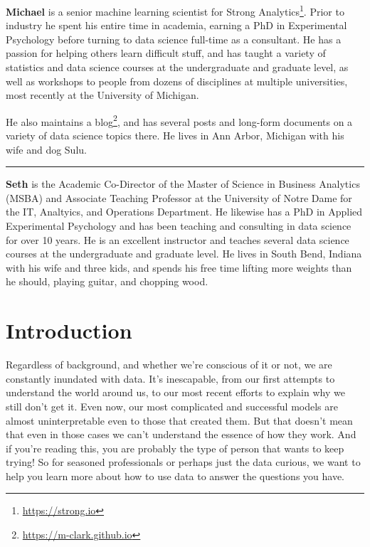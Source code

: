 \documentclass[
  letterpaper,
]{krantz}
\DeclareRobustCommand{\href}[2]{#2\footnote{\url{#1}}}
\begin{document}
\textbf{Michael} is a senior machine learning scientist for
\href{https://strong.io}{Strong Analytics}. Prior to industry he spent
his entire time in academia, earning a PhD in Experimental Psychology
before turning to data science full-time as a consultant. He has a
passion for helping others learn difficult stuff, and has taught a
variety of statistics and data science courses at the undergraduate and
graduate level, as well as workshops to people from dozens of
disciplines at multiple universities, most recently at the University of
Michigan.

He also maintains a \href{https://m-clark.github.io}{blog}, and has
several posts and long-form documents on a variety of data science
topics there. He lives in Ann Arbor, Michigan with his wife and dog
Sulu.

\begin{center}\rule{0.5\linewidth}{0.5pt}\end{center}

\textbf{Seth} is the Academic Co-Director of the Master of Science in
Business Analytics (MSBA) and Associate Teaching Professor at the
University of Notre Dame for the IT, Analtyics, and Operations
Department. He likewise has a PhD in Applied Experimental Psychology and
has been teaching and consulting in data science for over 10 years. He
is an excellent instructor and teaches several data science courses at
the undergraduate and graduate level. He lives in South Bend, Indiana
with his wife and three kids, and spends his free time lifting more
weights than he should, playing guitar, and chopping wood.


\chapter*{Introduction}\label{introduction}



Regardless of background, and whether we're conscious of it or not, we
are constantly inundated with data. It's inescapable, from our first
attempts to understand the world around us, to our most recent efforts
to explain why we still don't get it. Even now, our most complicated and
successful models are almost uninterpretable even to those that created
them. But that doesn't mean that even in those cases we can't understand
the essence of how they work. And if you're reading this, you are
probably the type of person that wants to keep trying! So for seasoned
professionals or perhaps just the data curious, we want to help you
learn more about how to use data to answer the questions you have.
\end{document}
